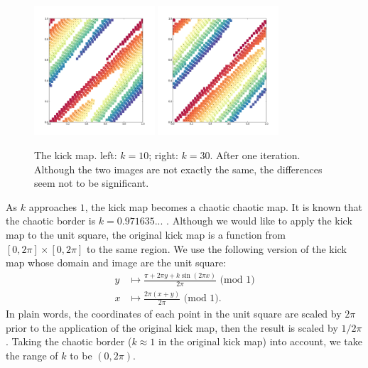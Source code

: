 \documentclass[12pt]{reedmcm}
\begin{document}
\begin{figure}[p]
  \centering
  \includegraphics[width=0.4\textwidth]{kickmap_2pi}
  \hspace{2cm}
  \includegraphics[width=0.4\textwidth]{kickmap_3pi}
  \caption{The kick map. left: $k=10$; right: $k = 30$. After one iteration. 
    Although the two images are not exactly the same, the differences seem not to be significant.
  }
  \label{fig:kickmap_demo2}
\end{figure}
%
As $k$ approaches $1$, the kick map becomes a chaotic chaotic map.
It is known that the chaotic border is $k = 0.971635...$ \citep{spedia}.
Although we would like to apply the kick map to the unit square, the original kick map is a function from $[0,2\pi] \times [0,2\pi]$ to the same region.
We use the following version of the kick map whose domain and image are the unit square:
\begin{align*}
  y &\mapsto \frac{\pi + 2\pi y + k \sin (2\pi x)}{2\pi} \mbox{ (mod 1)}\\
  x &\mapsto \frac{2\pi (x + y)}{2\pi} \mbox{ (mod 1)}.
\end{align*}
In plain words, the coordinates of each point in the unit square are scaled by $2\pi$ prior to the application of the original kick map, then the result is scaled by $1/2\pi$.
Taking the chaotic border ($k\approx 1$ in the original kick map) into account, we take the range of $k$ to be $(0,2\pi)$.
\end{document}
